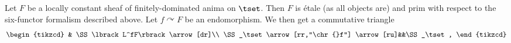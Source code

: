   Let $F$ be a locally constant sheaf of finitely-dominated anima on $\tset$. Then $F$ is \'etale (as all objects are) and prim with respect to the six-functor formalism described above. Let $f\curvearrowright F$ be an endomorphism. We then get a commutative triangle
  \begin{equation}
    \label{eq:homotopical-lefschetz-trace}
    \begin{tikzcd}
      & \SS\lbrack L^fF\rbrack\arrow[dr]\\
      \SS_\tset\arrow[rr,"\chr {}f"] \arrow[ru]&&\SS_\tset,
    \end{tikzcd}
  \end{equation}

 



